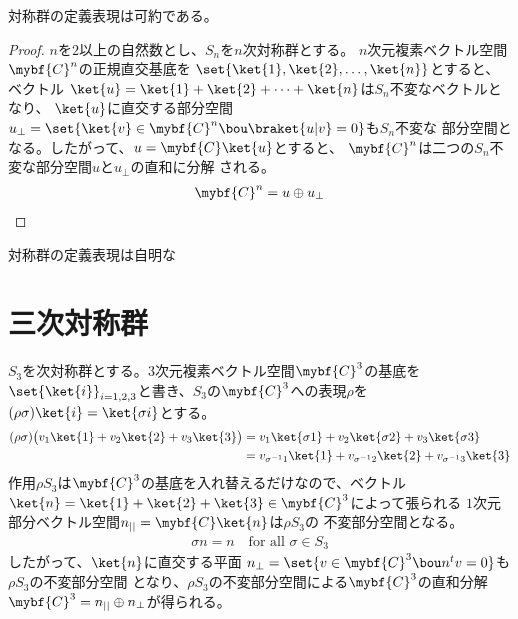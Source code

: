 	\begin{proposition}[定義表現は可約]\label{prop:定義表現は可約} %
		対称群の定義表現は可約である。
	\end{proposition} %
	\begin{proof} %
		$n$を$2$以上の自然数とし、$S_n$を$n$次対称群とする。
		$n$次元複素ベクトル空間$\mybf{C}^n$の正規直交基底を
		$\set{\ket{1},\ket{2},\dots,\ket{n}}$とすると、ベクトル
		$\ket{u}=\ket{1}+\ket{2}+\cdots+\ket{n}$は$S_n$不変なベクトルとなり、
		$\ket{u}$に直交する部分空間
		$u_\perp=\set{\ket{v}\in\mybf{C}^n\bou \braket{u|v}=0}$も$S_n$不変な
		部分空間となる。したがって、$u=\mybf{C}\ket{u}$とすると、
		$\mybf{C}^n$は二つの$S_n$不変な部分空間$u$と$u_\perp$の直和に分解
		される。
		\begin{equation*}\begin{split} %
			\mybf{C}^n=u\oplus u_\perp
		\end{split}\end{equation*} %
	\end{proof} %

	\begin{definition}[標準表現]\label{def:標準表現} %
		対称群の定義表現は自明な
	\end{definition} %

\section{三次対称群}\label{s1:三次対称群} %
	$S_3$を次対称群とする。$3$次元複素ベクトル空間$\mybf{C}^3$の基底を
	$\set{\ket{i}}_{i=1,2,3}$と書き、$S_3$の$\mybf{C}^3$への表現$\rho$を
	$(\rho\sigma)\ket{i}=\ket{\sigma i}$とする。
	\begin{equation*}\begin{split} %
		(\rho\sigma)\bigl(v_1\ket{1}+v_2\ket{2}+v_3\ket{3}\bigr)
		&= v_1\ket{\sigma1}+v_2\ket{\sigma2}+v_3\ket{\sigma3} \\
		&= v_{\sigma^{-1}1}\ket{1}+v_{\sigma^{-1}2}\ket{2}+v_{\sigma^{-1}3}\ket{3} \\
	\end{split}\end{equation*} %
	作用$\rho S_3$は$\mybf{C}^3$の基底を入れ替えるだけなので、ベクトル
	$\ket{n}=\ket{1}+\ket{2}+\ket{3}\in \mybf{C}^3$によって張られる
	$1$次元部分ベクトル空間$n_{||}=\mybf{C}\ket{n}$は$\rho S_3$の
	不変部分空間となる。
	\begin{equation*}\begin{split} %
		\sigma n = n \quad\text{for all }\sigma\in S_3
	\end{split}\end{equation*} %
	したがって、$\ket{n}$に直交する平面
	$n_\perp=\set{v\in \mybf{C}^3\bou n^tv=0}$も$\rho S_3$の不変部分空間
	となり、$\rho S_3$の不変部分空間による$\mybf{C}^3$の直和分解
	$\mybf{C}^3=n_{||}\oplus n_\perp$が得られる。


